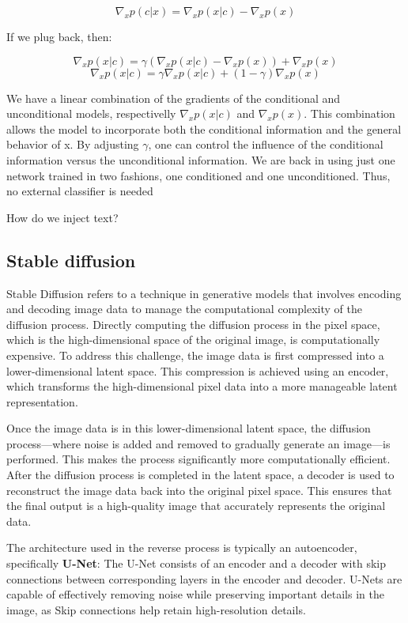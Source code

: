 $$ \nabla_x  p(c|x)  = \nabla_x  p(x|c) - \nabla_x  p(x)$$

If we plug back, then:

$$\nabla_x  p(x|c)= \gamma(\nabla_x  p(x|c) - \nabla_x  p(x))+ \nabla_x  p(x) $$
$$\nabla_x  p(x|c)= \gamma\nabla_x  p(x|c) + (1-\gamma)\nabla_x  p(x) $$

We have a linear combination of the gradients of the conditional and unconditional models, respectivelly $\nabla_x  p(x|c)$ and $\nabla_x  p(x)$. This combination allows the model to incorporate both the conditional information and the general behavior of x. By adjusting $\gamma$, one can control the influence of the conditional information versus the unconditional information. We are back in using just one network trained in two fashions, one conditioned and one unconditioned. Thus, no external classifier is needed

How do we inject text?

\subsection{Stable diffusion}

Stable Diffusion refers to a technique in generative models that involves encoding and decoding image data to manage the computational complexity of the diffusion process. Directly computing the diffusion process in the pixel space, which is the high-dimensional space of the original image, is computationally expensive. To address this challenge, the image data is first compressed into a lower-dimensional latent space. This compression is achieved using an encoder, which transforms the high-dimensional pixel data into a more manageable latent representation.

Once the image data is in this lower-dimensional latent space, the diffusion process—where noise is added and removed to gradually generate an image—is performed. This makes the process significantly more computationally efficient. After the diffusion process is completed in the latent space, a decoder is used to reconstruct the image data back into the original pixel space. This ensures that the final output is a high-quality image that accurately represents the original data.

The architecture used in the reverse process is typically an autoencoder, specifically \textbf{U-Net}: The U-Net consists of an encoder  and a decoder with skip connections between corresponding layers in the encoder and decoder. U-Nets are capable of effectively removing noise while preserving important details in the image, as Skip connections help retain high-resolution details.

